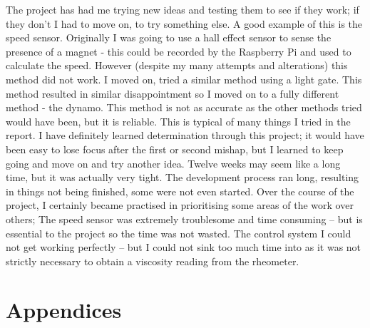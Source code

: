 \documentclass[twoside,a4]{report}
\def\shorttitle{Development of a Rheometer Controller}
\def\br{\newline \newline \noindent}
\def\achapter{\shorttitle}  %
\begin{document}
	The project has had me trying new ideas and testing them to see if they work; if they don't I had to move on, to try something else. A good example of this is the speed sensor. Originally I was going to use a hall effect sensor to sense the presence of a magnet - this could be recorded by the Raspberry Pi and used to calculate the speed. However (despite my many attempts and alterations) this method did not work. I moved on, tried a similar method using a light gate. This method resulted in similar disappointment so I moved on to a fully different method - the dynamo. This method is not as accurate as the other methods tried would have been, but it is reliable. This is typical of many things I tried in the report. I have definitely learned determination through this project; it would have been easy to lose focus after the first or second mishap, but I learned to keep going and move on and try another idea.
	\br
	Twelve weeks may seem like a long time, but it was actually very tight. The development process ran long, resulting in things not being finished, some were not even started. Over the course of the project, I certainly became practised in prioritising some areas of the work over others; The speed sensor was extremely troublesome and time consuming -- but is essential to the project so the time was not wasted. The control system I could not get working perfectly -- but I could not sink too much time into as it was not strictly necessary to obtain a viscosity reading from the rheometer.
	
	\newpage
	\def\achapter{\arabic{chapter} Nomenclature}
	\printnomenclature[1.5cm]
	
	\newpage
	\def\achapter{Bibliography}
	
	




\appendix


\chapter*{Appendices}
\end{document}
